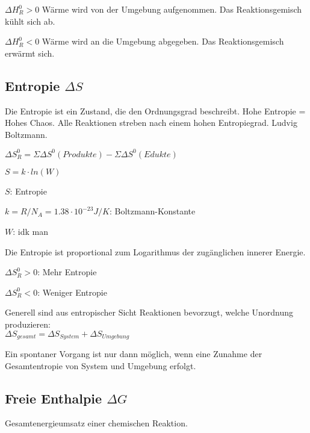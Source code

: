 \begin{definition}
$\Delta H^0_R > 0$
Wärme wird von der Umgebung aufgenommen. Das Reaktionsgemisch kühlt sich ab.
\end{definition}

\begin{definition}
$\Delta H^0_R < 0$
Wärme wird an die Umgebung abgegeben. Das Reaktionsgemisch erwärmt sich.
\end{definition}

\subsection{Entropie $\Delta S$}

Die Entropie ist ein Zustand, die den Ordnungsgrad beschreibt. Hohe Entropie = Hohes Chaos. Alle Reaktionen streben nach einem hohen Entropiegrad. Ludvig Boltzmann.

{\large
	$\Delta S^0_R = \Sigma \Delta S^0 (Produkte) - \Sigma \Delta S^0 (Edukte)$
}

\begin{definition}[Entropieformel]
	$S = k \cdot ln(W)$
	
	$S$: Entropie
	
	$k=R/N_A=1.38\cdot 10^{-23} J/K$: Boltzmann-Konstante 
	
	$W$: idk man
	
	Die Entropie ist proportional zum Logarithmus der zugänglichen innerer Energie.
\end{definition}

\begin{definition}[Entropieänderung]
	$\Delta S^0_R > 0$: Mehr Entropie
	
	$\Delta S^0_R < 0$: Weniger Entropie
\end{definition}

Generell sind aus entropischer Sicht Reaktionen bevorzugt, welche Unordnung produzieren: \\
$\Delta S_{gesamt} = \Delta S_{System} + \Delta S_{Umgebung}$

Ein spontaner Vorgang ist nur dann möglich, wenn eine Zunahme der Gesamtentropie von System und Umgebung erfolgt.


\subsection{Freie Enthalpie $\Delta G$}

Gesamtenergieumsatz einer chemischen Reaktion.


